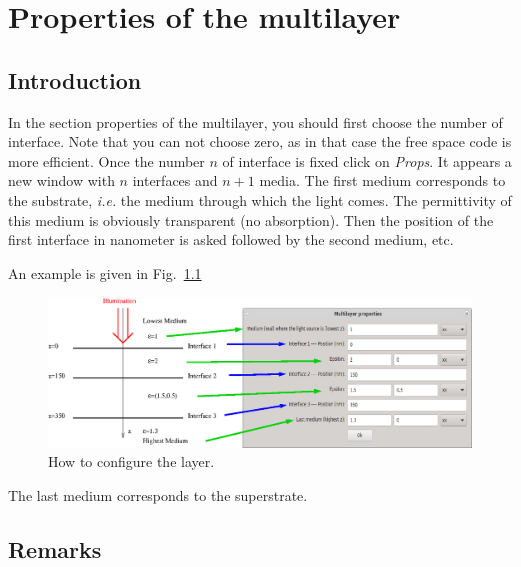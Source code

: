 \chapter{Properties of the multilayer }\label{chapl}

\minitoc

\section{Introduction}

In the section properties of the multilayer, you should first choose
the number of interface. Note that you can not choose zero, as in that
case the free space code is more efficient. Once the number $n$ of
interface is fixed click on {\it Props}. It appears a new window with
$n$ interfaces and $n+1$ media. The first medium corresponds to the
substrate, {\it i.e.} the medium through which the light comes. The
permittivity of this medium is obviously transparent (no
absorption). Then the position of the first interface in nanometer is
asked followed by the second medium, etc.


An example is given in Fig.~\ref{configlayer}
\begin{figure}
\begin{center}
  \includegraphics*[width=15.0cm,draft=false]{configlayer.eps}
\end{center}
\caption{How to configure the layer.}
\label{configlayer}
\end{figure}


The last medium corresponds to the superstrate.


\section{Remarks}

